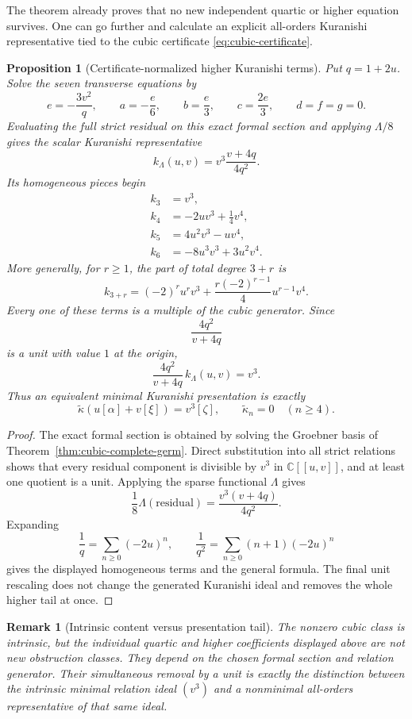 \documentclass[11pt]{amsart}
\newtheorem{proposition}[theorem]{Proposition}
\newtheorem{remark}[theorem]{Remark}
\newcommand{\C}{\mathbb C}
\begin{document}
The theorem already proves that no new independent quartic or higher equation survives.  One can go further and calculate an explicit all-orders Kuranishi representative tied to the cubic certificate \eqref{eq:cubic-certificate}.

\begin{proposition}[Certificate-normalized higher Kuranishi terms]\label{prop:cubic-higher-tail}
Put $q=1+2u$.  Solve the seven transverse equations by
\[
e=-\frac{3v^2}{q},
\qquad
a=-\frac e6,
\qquad b=\frac e3,
\qquad c=\frac{2e}{3},
\qquad d=f=g=0.
\]
Evaluating the full strict residual on this exact formal section and applying $\Lambda/8$ gives the scalar Kuranishi representative
\[
\boxed{
 k_\Lambda(u,v)
 =
 v^3\frac{v+4q}{4q^2}.
}
\]
Its homogeneous pieces begin
\begin{align*}
k_3&=v^3,\\
k_4&=-2uv^3+\frac14v^4,\\
k_5&=4u^2v^3-uv^4,\\
k_6&=-8u^3v^3+3u^2v^4.
\end{align*}
More generally, for $r\ge1$, the part of total degree $3+r$ is
\[
\boxed{
 k_{3+r}
 =
 (-2)^r u^r v^3
 +\frac{r(-2)^{r-1}}{4}u^{r-1}v^4.
}
\]
Every one of these terms is a multiple of the cubic generator.  Since
\[
\frac{4q^2}{v+4q}
\]
is a unit with value $1$ at the origin,
\[
\frac{4q^2}{v+4q}\,k_\Lambda(u,v)=v^3.
\]
Thus an equivalent minimal Kuranishi presentation is exactly
\[
\boxed{
\widetilde\kappa(u[\alpha]+v[\xi])=v^3[\zeta],
\qquad
\widetilde\kappa_n=0\quad(n\ge4).
}
\]
\end{proposition}

\begin{proof}
The exact formal section is obtained by solving the Groebner basis of Theorem~\ref{thm:cubic-complete-germ}.  Direct substitution into all strict relations shows that every residual component is divisible by $v^3$ in $\C[[u,v]]$, and at least one quotient is a unit.  Applying the sparse functional $\Lambda$ gives
\[
\frac18\Lambda(\text{residual})
=
\frac{v^3(v+4q)}{4q^2}.
\]
Expanding
\[
\frac1q=\sum_{n\ge0}(-2u)^n,
\qquad
\frac1{q^2}=\sum_{n\ge0}(n+1)(-2u)^n
\]
gives the displayed homogeneous terms and the general formula.  The final unit rescaling does not change the generated Kuranishi ideal and removes the whole higher tail at once.
\end{proof}

\begin{remark}[Intrinsic content versus presentation tail]
The nonzero cubic class is intrinsic, but the individual quartic and higher coefficients displayed above are not new obstruction classes.  They depend on the chosen formal section and relation generator.  Their simultaneous removal by a unit is exactly the distinction between the intrinsic minimal relation ideal $(v^3)$ and a nonminimal all-orders representative of that same ideal.
\end{remark}
\end{document}
